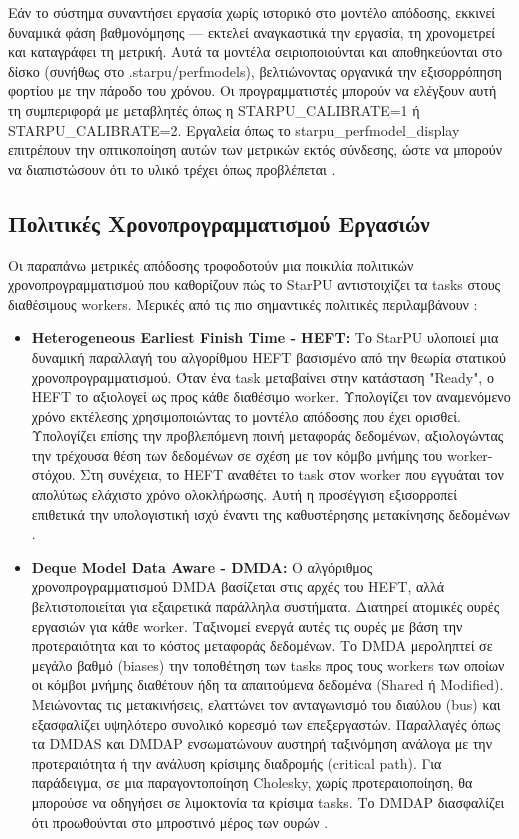Εάν το σύστημα συναντήσει εργασία χωρίς ιστορικό στο μοντέλο απόδοσης, εκκινεί δυναμικά φάση βαθμονόμησης — εκτελεί αναγκαστικά την εργασία, τη χρονομετρεί και καταγράφει τη μετρική. Αυτά τα μοντέλα σειριοποιούνται και αποθηκεύονται στο δίσκο (συνήθως στο .starpu/perfmodels), βελτιώνοντας οργανικά την εξισορρόπηση φορτίου με την πάροδο του χρόνου. Οι προγραμματιστές μπορούν να ελέγξουν αυτή τη συμπεριφορά με μεταβλητές όπως η STARPU\_CALIBRATE=1 ή STARPU\_CALIBRATE=2. Εργαλεία όπως το starpu\_perfmodel\_display επιτρέπουν την οπτικοποίηση αυτών των μετρικών εκτός σύνδεσης, ώστε να μπορούν να διαπιστώσουν ότι το υλικό τρέχει όπως προβλέπεται \cite{starpu2025handbook,starpu_dev_manual,augonnet2010starpu_saahpc}.

\subsection{Πολιτικές Χρονοπρογραμματισμού Εργασιών}

Οι παραπάνω μετρικές απόδοσης τροφοδοτούν μια ποικιλία πολιτικών χρονοπρογραμματισμού που καθορίζουν πώς το StarPU αντιστοιχίζει τα tasks στους διαθέσιμους workers. Μερικές από τις πιο σημαντικές πολιτικές περιλαμβάνουν \cite{starpu2025handbook,augonnet2010data}:

\begin{itemize}
  \item \textbf{Heterogeneous Earliest Finish Time - HEFT:} Το StarPU υλοποιεί μια δυναμική παραλλαγή του αλγορίθμου HEFT βασισμένο από την θεωρία στατικού χρονοπρογραμματισμού. Όταν ένα task μεταβαίνει στην κατάσταση "Ready", ο HEFT το αξιολογεί ως προς κάθε διαθέσιμο worker. Υπολογίζει τον αναμενόμενο χρόνο εκτέλεσης χρησιμοποιώντας το μοντέλο απόδοσης που έχει ορισθεί. Υπολογίζει επίσης την προβλεπόμενη ποινή μεταφοράς δεδομένων, αξιολογώντας την τρέχουσα θέση των δεδομένων σε σχέση με τον κόμβο μνήμης του worker-στόχου. Στη συνέχεια, το HEFT αναθέτει το task στον worker που εγγυάται τον απολύτως ελάχιστο χρόνο ολοκλήρωσης. Αυτή η προσέγγιση εξισορροπεί επιθετικά την υπολογιστική ισχύ έναντι της καθυστέρησης μετακίνησης δεδομένων \cite{augonnet2009starpu,starpu2025handbook,starpu_website}.
  \item \textbf{Deque Model Data Aware - DMDA:} Ο αλγόριθμος χρονοπρογραμματισμού DMDA βασίζεται στις αρχές του HEFT, αλλά βελτιστοποιείται για εξαιρετικά παράλληλα συστήματα. Διατηρεί ατομικές ουρές εργασιών για κάθε worker. Ταξινομεί ενεργά αυτές τις ουρές με βάση την προτεραιότητα και το κόστος μεταφοράς δεδομένων. Το DMDA μεροληπτεί σε μεγάλο βαθμό (biases) την τοποθέτηση των tasks προς τους workers των οποίων οι κόμβοι μνήμης διαθέτουν ήδη τα απαιτούμενα δεδομένα (Shared ή Modified). Μειώνοντας τις μετακινήσεις, ελαττώνει τον ανταγωνισμό του διαύλου (bus) και εξασφαλίζει υψηλότερο συνολικό κορεσμό των επεξεργαστών. Παραλλαγές όπως τα DMDAS και DMDAP ενσωματώνουν αυστηρή ταξινόμηση ανάλογα με την προτεραιότητα ή την ανάλυση κρίσιμης διαδρομής (critical path). Για παράδειγμα, σε μια παραγοντοποίηση Cholesky, χωρίς προτεραιοποίηση, θα μπορούσε να οδηγήσει σε λιμοκτονία τα κρίσιμα tasks. Το DMDAP διασφαλίζει ότι προωθούνται στο μπροστινό μέρος των ουρών \cite{starpu2025handbook,augonnet:inria-00467677,starpu_website}.
\end{itemize}

